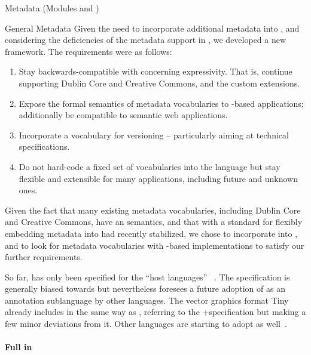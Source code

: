 \begin{tchapter}[id=metadata,short=Metadata]{Metadata (Modules {} and  {})}
\begin{tsection}{General Metadata}
Given the need to incorporate additional metadata into \omdoc, and considering the deficiencies of the metadata support in , we developed a new framework.  The requirements were as follows:

\begin{enumerate}
\item Stay backwards-compatible with  concerning expressivity.  That is,   continue supporting Dublin Core and Creative Commons, and the custom extensions.
\item Expose the formal semantics of metadata vocabularies to \omdoc-based applications; additionally be compatible to semantic web applications.
\item Incorporate a vocabulary for versioning -- particularly aiming at technical   specifications.
\item Do not hard-code a fixed set of vocabularies into the language but stay flexible   and extensible for many applications, including future and unknown ones.
\end{enumerate}

Given the fact that many existing metadata vocabularies, including
Dublin Core and Creative Commons, have an \rdf semantics,
and that with \rdfa{} a standard for flexibly embedding metadata into \xml had recently stabilized, we chose to incorporate \rdfa into \omdoc, and to look for metadata vocabularies with \rdf-based implementations to satisfy our further requirements.

So far, \rdfa has only been specified for the \enquote{host languages} \xhtml~\cite{AdidaEtAl08:RDFa}.  The specification is generally biased towards \xhtml but nevertheless foresees a future adoption of \rdfa as an annotation sublanguage by other \xml languages.  The vector graphics format \svg Tiny already includes \rdfa in the same way as \xhtml, referring to the \xhtml+\rdfa specification but making a few minor deviations from it.  Other languages are starting to adopt \rdfa as well~\cite{RDFaHostLanguages}.

\paragraph{Full \rdfa in \omdoc}
\label{sec:new-metadata-rdfa}


\end{tsection}
\end{tchapter}
